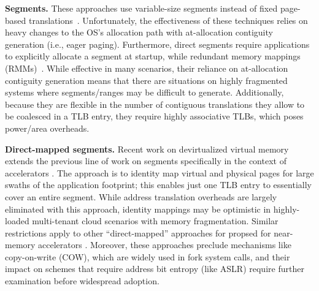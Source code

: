 \vspace{2mm}
\noindent\textbf{Segments.} These approaches use variable-size segments
instead of fixed page-based translations~\cite{karakostas:redundant,
  park:hybrid, basu:efficient}. Unfortunately, the effectiveness of
these techniques relies on heavy changes to the OS's allocation path
with at-allocation contiguity generation (i.e., eager
paging). Furthermore, direct segments require applications to
explicitly allocate a segment at startup, while redundant memory
mappings (RMMs)~\cite{karakostas:redundant}. While effective in many
scenarios, their reliance on at-allocation contiguity generation means
that there are situations on highly fragmented systems where
segments/ranges may be difficult to generate. Additionally, because
they are flexible in the number of contiguous translations they allow
to be coalesced in a TLB entry, they require highly associative TLBs,
which poses power/area overheads.

\vspace{2mm}
\noindent\textbf{Direct-mapped segments.} Recent work on devirtualized
virtual memory extends the previous line of work on segments
specifically in the context of accelerators
\cite{haria:devirtualizing}. The approach is to identity map virtual
and physical pages for large swaths of the application footprint; this
enables just one TLB entry to essentially cover an entire
segment. While address translation overheads are largely eliminated
with this approach, identity mappings may be optimistic in
highly-loaded multi-tenant cloud scenarios with memory
fragmentation. Similar restrictions apply to other ``direct-mapped''
approaches for propsed for near-memory accelerators
\cite{picorel:near-memory}. Moreover, these approaches preclude
mechanisms like copy-on-write (COW), which are widely used in fork
system calls, and their impact on schemes that require address bit
entropy (like ASLR) require further examination before widespread
adoption.



